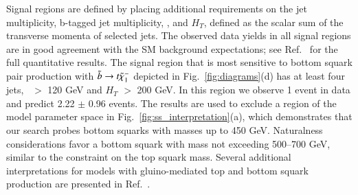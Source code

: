 Signal regions are defined by placing additional requirements on the jet multiplicity, b-tagged jet multiplicity, 
\met, and $H_T$, defined as the scalar sum of the transverse momenta of selected jets. 
The observed data yields in all signal regions are in good agreement with the SM background expectations;
see Ref.~\cite{ref:ss} for the full quantitative results. The signal region that is most sensitive to 
bottom squark pair production with $\tilde{b}\to t \tilde{\chi}_{1}^{-}$ depicted in Fig.~\ref{fig:diagrams}(d) 
has at least four jets, \met\ $>$ 120 GeV and
$H_T$ $>$ 200 GeV. In this region we observe 1 event in data and predict 2.22 $\pm$ 0.96 events.
The results are used to exclude a region of the model parameter space in Fig.~\ref{fig:ss_interpretation}(a),
which demonstrates that our search probes bottom squarks with masses up to 450 GeV.
Naturalness considerations favor a bottom squark with mass not exceeding 500--700 GeV, similar to the constraint
on the top squark mass.
Several additional interpretations for models with gluino-mediated top and 
bottom squark production are presented in Ref.~\cite{ref:ss}.

%



